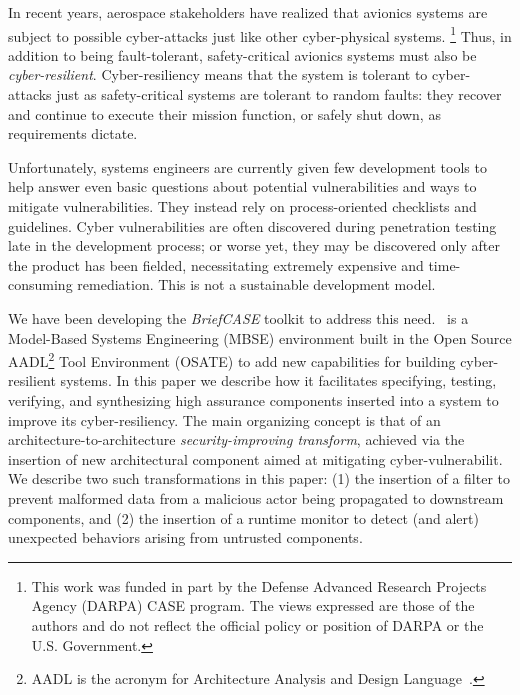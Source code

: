 

In recent years, aerospace stakeholders have realized that avionics
systems are subject to possible cyber-attacks just like other
cyber-physical systems.
%
\footnote{This work was funded in part by the
Defense Advanced Research Projects Agency (DARPA) CASE program.  The views
expressed are those of the authors and do not reflect the official
policy or position of DARPA or the U.S. Government.}
%
Thus, in addition to being fault-tolerant, safety-critical avionics
systems must also be {\em cyber-resilient}.  Cyber-resiliency means
that the system is tolerant to cyber-attacks just as safety-critical
systems are tolerant to random faults: they recover and continue to
execute their mission function, or safely shut down, as requirements
dictate.

Unfortunately, systems engineers are currently given few development
tools to help answer even basic questions about potential
vulnerabilities and ways to mitigate vulnerabilities.  They instead
rely on process-oriented checklists and guidelines.  Cyber
vulnerabilities are often discovered during penetration testing late
in the development process; or worse yet, they may be discovered only
after the product has been fielded, necessitating extremely expensive
and time-consuming remediation. This is not a sustainable development
model.


We have been developing the {\em BriefCASE}  toolkit to address this need.
\brfcs\ is a Model-Based Systems Engineering (MBSE) environment
built in the Open Source AADL\footnote{AADL is the acronym for
Architecture Analysis and Design Language~\cite{aadl}.}  Tool
Environment (OSATE) to add new capabilities for building
cyber-resilient systems. 
%
In this paper we describe how it facilitates specifying, testing,
verifying, and synthesizing high assurance components inserted into a
system to improve its cyber-resiliency.  The main organizing concept
is that of an architecture-to-architecture \emph{security-improving
transform}, achieved via the insertion of  new architectural
component aimed at mitigating  cyber-vulnerabilit.  We describe two
such transformations in this paper: (1) the insertion of a
filter to prevent malformed data from a malicious actor being
propagated to downstream components, and (2) the insertion of a
runtime monitor to detect (and alert) unexpected behaviors arising
from untrusted components.


